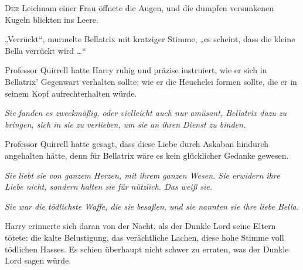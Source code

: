 
\lettrine{D}{er} Leichnam einer Frau öffnete die Augen, und die dumpfen versunkenen Kugeln blickten ins Leere.

„Verrückt“, murmelte Bellatrix mit kratziger Stimme, „es scheint, dass die kleine Bella verrückt wird …“

Professor Quirrell hatte Harry ruhig und präzise instruiert, wie er sich in Bellatrix’ Gegenwart verhalten sollte; wie er die Heuchelei formen sollte, die er in seinem Kopf aufrechterhalten würde.

\emph{Sie fanden es zweckmäßig, oder vielleicht auch nur amüsant, Bellatrix dazu zu bringen, sich in sie zu verlieben, um sie an ihren Dienst zu binden.}

Professor Quirrell hatte gesagt, dass diese Liebe durch Askaban hindurch angehalten hätte, denn für Bellatrix wäre es kein glücklicher Gedanke gewesen.

\emph{Sie liebt sie von ganzem Herzen, mit ihrem ganzen Wesen. Sie erwidern ihre Liebe nicht, sondern halten sie für nützlich. Das weiß sie.}

\emph{Sie war die tödlichste Waffe, die sie besaßen, und sie nannten sie ihre liebe Bella.}

Harry erinnerte sich daran von der Nacht, als der Dunkle Lord seine Eltern tötete: die kalte Belustigung, das verächtliche Lachen, diese hohe Stimme voll tödlichen Hasses. Es schien überhaupt nicht schwer zu erraten, was der Dunkle Lord sagen würde.

